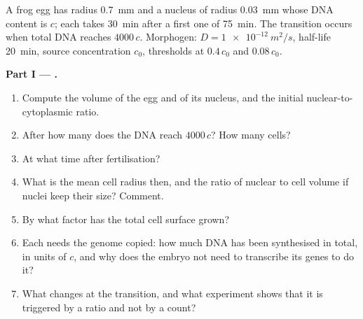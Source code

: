 \begin{problem}
\label{pb:b2:vertebrate-development:1}
A frog egg has radius \qty{0.7}{mm} and a nucleus of radius
\qty{0.03}{mm} whose DNA content is $c$; each  takes
\qty{30}{min} after a first one of \qty{75}{min}. The 
transition occurs when total DNA reaches $4000\,c$. Morphogen: $D =
\qty{1e-12}{m^2/s}$, half-life \qty{20}{min}, source concentration
$c_0$, thresholds at $0.4\,c_0$ and $0.08\,c_0$.

\medskip
\noindent\textbf{Part I --- .}
\begin{enumerate}
  \item Compute the volume of the egg and of its nucleus, and the
        initial nuclear-to-cytoplasmic ratio.
  \item After how many  does the DNA reach $4000\,c$? How
        many cells?
  \item At what time after fertilisation?
  \item What is the mean cell radius then, and the ratio of nuclear
        to cell volume if nuclei keep their size? Comment.
  \item By what factor has the total cell surface grown?
  \item Each  needs the genome copied: how much DNA has been
        synthesised in total, in units of $c$, and why does the embryo
        not need to transcribe its genes to do it?
  \item What changes at the transition, and what experiment shows
        that it is triggered by a ratio and not by a count?
\end{enumerate}


\end{problem}
